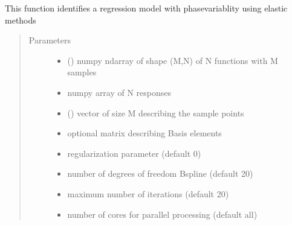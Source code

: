 \documentclass[letterpaper,10pt,english]{sphinxmanual}
\begin{document}

\begin{fulllineitems}
\label{\detokenize{regression:regression.elastic_regression}}
This function identifies a regression model with phase\sphinxhyphen{}variablity
using elastic methods
\begin{quote}\begin{description}
\item[{Parameters}] \leavevmode\begin{itemize}
\item {} 
 () \textendash{} numpy ndarray of shape (M,N) of N functions with M samples

\item {} 
 \textendash{} numpy array of N responses

\item {} 
 () \textendash{} vector of size M describing the sample points

\item {} 
 \textendash{} optional matrix describing Basis elements

\item {} 
 \textendash{} regularization parameter (default 0)

\item {} 
 \textendash{} number of degrees of freedom B\sphinxhyphen{}spline (default 20)

\item {} 
 \textendash{} maximum number of iterations (default 20)

\item {} 
 \textendash{} number of cores for parallel processing (default all)


\end{itemize}
\end{description}
\end{quote}
\end{fulllineitems}
\end{document}
